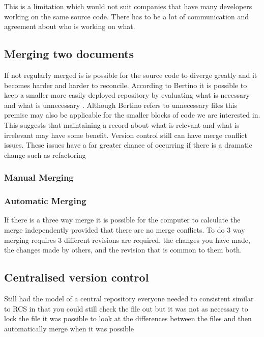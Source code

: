 This is a limitation which would not suit companies that have many developers working on the same source code.  
There has to be a lot of communication and agreement about who is working on what.

\subsection{Merging two documents}

If not regularly merged is is possible for the source code to diverge greatly and it becomes harder and harder to reconcile.
 According to Bertino it is possible to keep a smaller more easily deployed repository by evaluating what is necessary and what is unnecessary \cite{Bertino2012}. Although Bertino refers to unnecessary files this premise may also be applicable for the smaller blocks of code we are interested in. This suggests that maintaining a record about what is relevant and what is irrelevant may have some benefit. Version control still can have merge conflict issues. These issues have a far greater chance of occurring if there is a dramatic change such as refactoring
 
\subsubsection{Manual Merging}



\subsubsection{Automatic Merging}
If there is a three way merge it is possible for the computer to calculate the merge independently provided that there are no merge conflicts.
To do 3 way merging requires 3 different revisions are required, the changes you have made, the changes made by others, and the revision that is common to them both.


% 

\subsection{Centralised version control}
Still had the model of a central repository everyone needed to consistent
similar to RCS in that you could still check the file out but it was not as necessary to lock the file
it was possible to look at the differences between the files and then automatically merge when it was possible

